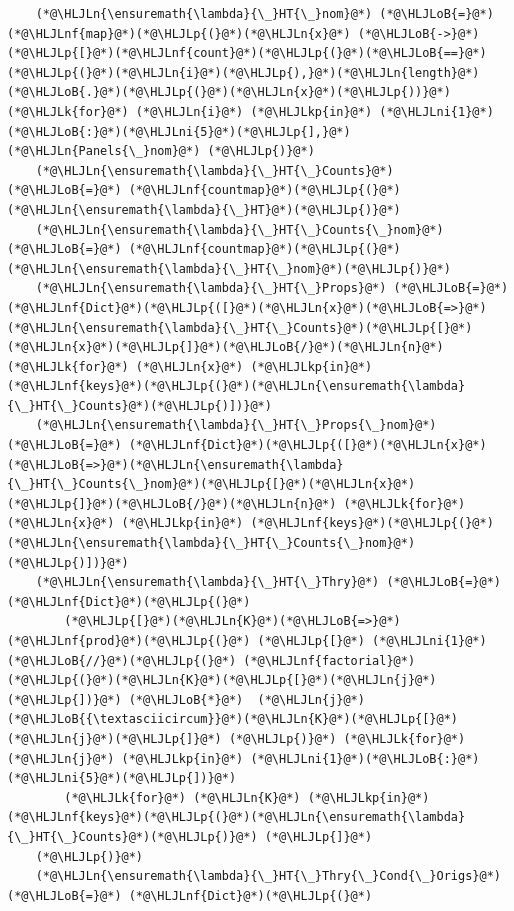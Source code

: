 \documentclass[12pt,a4paper]{article}
\newcommand{\HLJLk}[1]{\textcolor[RGB]{148,91,176}{\textbf{#1}}}
\newcommand{\HLJLkp}[1]{\textcolor[RGB]{148,91,176}{\textbf{#1}}}
\newcommand{\HLJLn}[1]{#1}
\newcommand{\HLJLnf}[1]{\textcolor[RGB]{66,102,213}{#1}}
\newcommand{\HLJLni}[1]{\textcolor[RGB]{59,151,46}{#1}}
\newcommand{\HLJLoB}[1]{\textcolor[RGB]{102,102,102}{\textbf{#1}}}
\newcommand{\HLJLp}[1]{#1}
\begin{document}
\begin{lstlisting}
	(*@\HLJLn{\ensuremath{\lambda}{\_}HT{\_}nom}@*) (*@\HLJLoB{=}@*) (*@\HLJLnf{map}@*)(*@\HLJLp{(}@*)(*@\HLJLn{x}@*) (*@\HLJLoB{->}@*) (*@\HLJLp{[}@*)(*@\HLJLnf{count}@*)(*@\HLJLp{(}@*)(*@\HLJLoB{==}@*)(*@\HLJLp{(}@*)(*@\HLJLn{i}@*)(*@\HLJLp{),}@*)(*@\HLJLn{length}@*)(*@\HLJLoB{.}@*)(*@\HLJLp{(}@*)(*@\HLJLn{x}@*)(*@\HLJLp{))}@*) (*@\HLJLk{for}@*) (*@\HLJLn{i}@*) (*@\HLJLkp{in}@*) (*@\HLJLni{1}@*)(*@\HLJLoB{:}@*)(*@\HLJLni{5}@*)(*@\HLJLp{],}@*) (*@\HLJLn{Panels{\_}nom}@*) (*@\HLJLp{)}@*)
	(*@\HLJLn{\ensuremath{\lambda}{\_}HT{\_}Counts}@*) (*@\HLJLoB{=}@*) (*@\HLJLnf{countmap}@*)(*@\HLJLp{(}@*)(*@\HLJLn{\ensuremath{\lambda}{\_}HT}@*)(*@\HLJLp{)}@*)
	(*@\HLJLn{\ensuremath{\lambda}{\_}HT{\_}Counts{\_}nom}@*) (*@\HLJLoB{=}@*) (*@\HLJLnf{countmap}@*)(*@\HLJLp{(}@*)(*@\HLJLn{\ensuremath{\lambda}{\_}HT{\_}nom}@*)(*@\HLJLp{)}@*)
	(*@\HLJLn{\ensuremath{\lambda}{\_}HT{\_}Props}@*) (*@\HLJLoB{=}@*) (*@\HLJLnf{Dict}@*)(*@\HLJLp{([}@*)(*@\HLJLn{x}@*)(*@\HLJLoB{=>}@*)(*@\HLJLn{\ensuremath{\lambda}{\_}HT{\_}Counts}@*)(*@\HLJLp{[}@*)(*@\HLJLn{x}@*)(*@\HLJLp{]}@*)(*@\HLJLoB{/}@*)(*@\HLJLn{n}@*) (*@\HLJLk{for}@*) (*@\HLJLn{x}@*) (*@\HLJLkp{in}@*) (*@\HLJLnf{keys}@*)(*@\HLJLp{(}@*)(*@\HLJLn{\ensuremath{\lambda}{\_}HT{\_}Counts}@*)(*@\HLJLp{)])}@*)
	(*@\HLJLn{\ensuremath{\lambda}{\_}HT{\_}Props{\_}nom}@*) (*@\HLJLoB{=}@*) (*@\HLJLnf{Dict}@*)(*@\HLJLp{([}@*)(*@\HLJLn{x}@*)(*@\HLJLoB{=>}@*)(*@\HLJLn{\ensuremath{\lambda}{\_}HT{\_}Counts{\_}nom}@*)(*@\HLJLp{[}@*)(*@\HLJLn{x}@*)(*@\HLJLp{]}@*)(*@\HLJLoB{/}@*)(*@\HLJLn{n}@*) (*@\HLJLk{for}@*) (*@\HLJLn{x}@*) (*@\HLJLkp{in}@*) (*@\HLJLnf{keys}@*)(*@\HLJLp{(}@*)(*@\HLJLn{\ensuremath{\lambda}{\_}HT{\_}Counts{\_}nom}@*)(*@\HLJLp{)])}@*)
	(*@\HLJLn{\ensuremath{\lambda}{\_}HT{\_}Thry}@*) (*@\HLJLoB{=}@*) (*@\HLJLnf{Dict}@*)(*@\HLJLp{(}@*)
		(*@\HLJLp{[}@*)(*@\HLJLn{K}@*)(*@\HLJLoB{=>}@*) (*@\HLJLnf{prod}@*)(*@\HLJLp{(}@*) (*@\HLJLp{[}@*) (*@\HLJLni{1}@*)(*@\HLJLoB{//}@*)(*@\HLJLp{(}@*) (*@\HLJLnf{factorial}@*)(*@\HLJLp{(}@*)(*@\HLJLn{K}@*)(*@\HLJLp{[}@*)(*@\HLJLn{j}@*)(*@\HLJLp{])}@*) (*@\HLJLoB{*}@*)  (*@\HLJLn{j}@*)(*@\HLJLoB{{\textasciicircum}}@*)(*@\HLJLn{K}@*)(*@\HLJLp{[}@*)(*@\HLJLn{j}@*)(*@\HLJLp{]}@*) (*@\HLJLp{)}@*) (*@\HLJLk{for}@*) (*@\HLJLn{j}@*) (*@\HLJLkp{in}@*) (*@\HLJLni{1}@*)(*@\HLJLoB{:}@*)(*@\HLJLni{5}@*)(*@\HLJLp{])}@*) 
		(*@\HLJLk{for}@*) (*@\HLJLn{K}@*) (*@\HLJLkp{in}@*) (*@\HLJLnf{keys}@*)(*@\HLJLp{(}@*)(*@\HLJLn{\ensuremath{\lambda}{\_}HT{\_}Counts}@*)(*@\HLJLp{)}@*) (*@\HLJLp{]}@*)
	(*@\HLJLp{)}@*)
	(*@\HLJLn{\ensuremath{\lambda}{\_}HT{\_}Thry{\_}Cond{\_}Origs}@*) (*@\HLJLoB{=}@*) (*@\HLJLnf{Dict}@*)(*@\HLJLp{(}@*)

\end{lstlisting}
\end{document}

